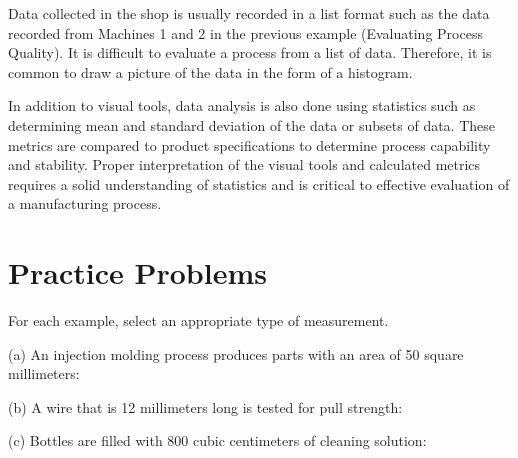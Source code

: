 \documentclass{ximera}
\begin{document}
Data collected in the shop is usually recorded in a list format such as the data recorded from Machines 1 and 2 in the previous example (Evaluating Process Quality). It is difficult to evaluate a process from a list of data. Therefore, it is common to draw a picture of the data in the form of a histogram.

In addition to visual tools, data analysis is also done using statistics such as determining mean and standard deviation of the data or subsets of data.  These metrics are compared to product specifications to determine process capability and stability. 
Proper interpretation of the visual tools and calculated metrics requires a solid understanding of statistics and is critical to effective evaluation of a manufacturing process. 








\section*{Practice Problems}

\begin{problem}\label{prob:lengthAreaVolume}
    For each example, select an appropriate type of measurement.

    (a)	An injection molding process produces parts with an area of 50 square millimeters: 

    (b) A wire that is 12 millimeters long is tested for pull strength: 

    (c)	Bottles are filled with 800 cubic centimeters of cleaning solution: 
\end{problem}
\end{document}
